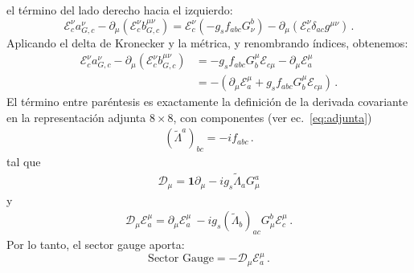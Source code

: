 el término del lado derecho hacia el izquierdo:
\begin{equation}
    \mathcal{E}_{c}^\nu a^\nu_{G, c} - \partial_\mu (\mathcal{E}_{c}^\nu b^{\mu\nu}_{G, c}) = \mathcal{E}_{c}^\nu (-g_s f_{abc} G_\nu^b) - \partial_\mu (\mathcal{E}_{c}^\nu \delta_{ac} g^{\mu\nu}) \, .
\end{equation}
Aplicando el delta de Kronecker y la métrica, y renombrando índices, obtenemos:
\begin{align}
  \label{eq:adjcov}
    \mathcal{E}_{c}^\nu a^\nu_{G, c} - \partial_\mu (\mathcal{E}_{c}^\nu b^{\mu\nu}_{G, c})    &= -g_s f_{abc} G^\mu_b \mathcal{E}_{c\mu} - \partial_\mu \mathcal{E}_{a}^\mu \nonumber \\
 &= - \left( \partial_\mu \mathcal{E}_{a}^\mu + g_s f_{abc} G^\mu_b \mathcal{E}_{c\mu} \right)\,.%
\end{align}
El término entre paréntesis es exactamente la definición de la derivada covariante en la representación adjunta $8\times 8$, con componentes (ver ec.~\eqref{eq:adjunta})
\begin{align}
\label{eq:adjunta2}
  \left(\widetilde{\Lambda}^a\right)_{bc} =-i f_{abc}\,.
\end{align}
tal que
\begin{align}
  \mathcal{D}_\mu = \boldsymbol{1}\partial_\mu -i g_s \widetilde{\Lambda}_a G_\mu^a  
\end{align}
y
\begin{align}
   \mathcal{D}_\mu\mathcal{E}_{a}^{\mu} = \partial_\mu\mathcal{E}^\mu_a \ -i g_s (\widetilde{\Lambda}_b)_{ac} G_\mu^b   \mathcal{E}^\mu_c\,.
\end{align}
Por lo tanto, el sector gauge aporta:
\begin{equation}
    \text{Sector Gauge} = - \mathcal{D}_\mu \mathcal{E}_{a}^\mu \, .
    \label{eq:sector_gauge}
\end{equation}

